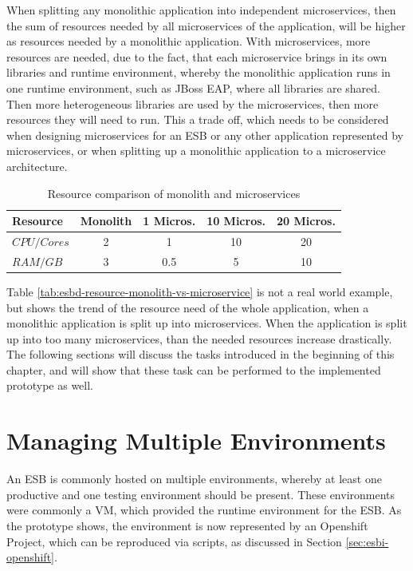 When splitting any monolithic application into independent microservices, then the sum of resources needed by all microservices of the application, will be higher as resources needed by a monolithic application. With microservices, more resources are needed, due to the fact, that each microservice brings in its own libraries and runtime environment, whereby the monolithic application runs in one runtime environment, such as JBoss EAP, where all libraries are shared. Then more heterogeneous libraries are used by the microservices, then more resources they will need to run. This a trade off, which needs to be considered when designing microservices for an ESB or any other application represented by microservices, or when splitting up a monolithic application to a microservice architecture.
\newpage
{\renewcommand{\arraystretch}{1.2}%
%
	\begin{table}[h]
		\begin{tabularx}{\textwidth}{ m|c|c|c|c }	
			\textbf{Resource}    & \textbf{Monolith} & \textbf{1 Micros.} & \textbf{10 Micros.} & \textbf{20 Micros.} \\  \hline
			\textit{$CPU/Cores$} & 2                 & 1                  & 10                  & 20 \\
			\textit{$RAM/GB$}    & 3                 & 0.5                & 5                   & 10 \\ \hline
		\end{tabularx}
		\caption{Resource comparison of monolith and microservices}
		\label{tab:esbd-resource-monolith-vs-microservice}
\end{table}}

Table \vref{tab:esbd-resource-monolith-vs-microservice} is not a real world example, but shows the trend of the resource need of the whole application, when a monolithic application is split up into microservices. When the application is split up into too many microservices, than the needed resources increase drastically. \\
 
The following sections will discuss the tasks introduced in the beginning of this chapter, and will show that these task can be performed to the implemented prototype as well.

\section{Managing Multiple Environments}
\label{sec:esbd-multiple-env}
An ESB is commonly hosted on multiple environments, whereby at least one productive and one testing environment should be present. These environments were commonly a VM, which provided the runtime environment for the ESB. As the prototype shows, the environment is now represented by an Openshift Project, which can be reproduced via scripts, as discussed in Section \vref{sec:esbi-openshift}. \\

